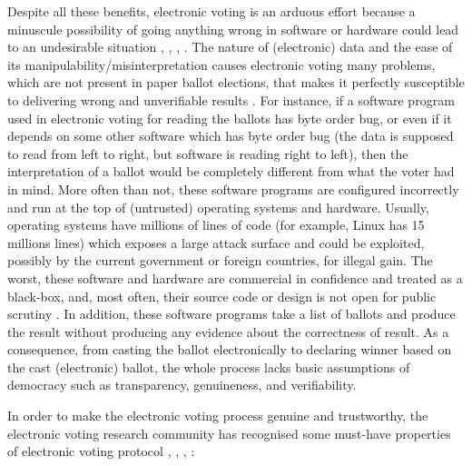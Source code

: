    
  Despite all these benefits, electronic voting is an arduous effort because a minuscule possibility of 
  going anything wrong in software or hardware could lead to an undesirable situation \citep{TSwiss},
  \citep{10.1007/978-3-319-22270-7_3}, \citep{ARANHA2019335},
  \citep{Feldman:2007:SAD:1323111.1323113}.  The nature of (electronic) data and the ease of 
  its manipulability/misinterpretation causes electronic voting many problems, which are not present in paper ballot elections, that 
  makes it perfectly susceptible to delivering wrong and unverifiable results \citep{Wolchok:2010:SAI:1866307.1866309}.
  For instance,  if a software program used in electronic voting 
  for reading the ballots has byte order bug, or even if it depends on some other software which has byte order bug (the data is supposed to read 
  from left to right, but software is reading right to left), then the interpretation of 
  a ballot would be completely different from what the voter had in mind.
  More often than not, these software programs are configured incorrectly \citep{1301313} and run at the top of (untrusted) operating 
  systems and hardware. Usually, operating systems have millions of lines of code (for example, Linux has 15 millions lines) which exposes
  a large attack surface and could be exploited, possibly by the current government or foreign countries, for illegal gain.
  The worst, these software and hardware  are commercial in 
  confidence and treated as a black-box, and, most often, their source code or design is not open 
  for public scrutiny \citep{AEC:2013:LMM}. In addition, these software programs 
  take a list of ballots and produce the result without producing any evidence about the correctness of result.  As a consequence,
  from casting the ballot electronically to declaring winner based on the cast (electronic) ballot, the whole process lacks basic assumptions
  of democracy such as transparency, genuineness, and verifiability. 
  
  In order to make the electronic voting process genuine and trustworthy, the electronic voting 
  research community has recognised some must-have properties of electronic voting protocol
  \citep{5958051}, 
   \citep{Benaloh:1994:RSE:195058.195407},  \citep{Delaune:2010:VPT}, \citep{Bernhard:2017:PES}:
  

